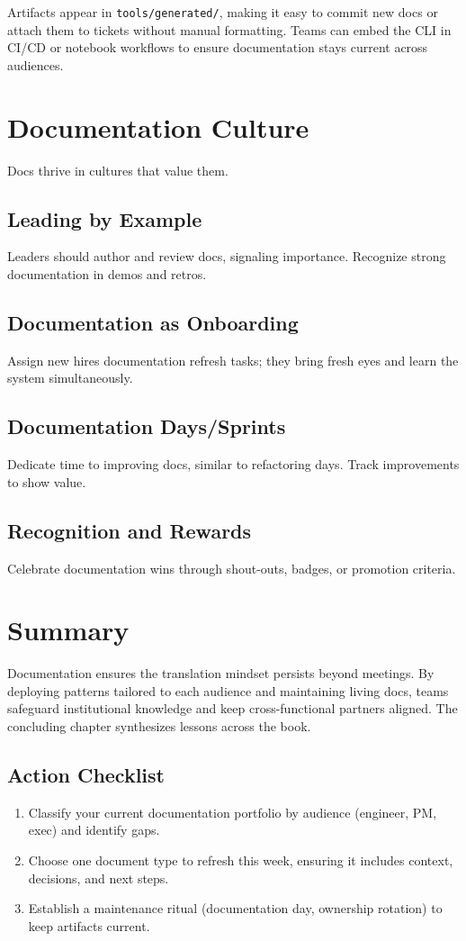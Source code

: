 Artifacts appear in \texttt{tools/generated/}, making it easy to commit new docs or attach them to tickets without manual formatting. Teams can embed the CLI in CI/CD or notebook workflows to ensure documentation stays current across audiences.

\section{Documentation Culture}
\label{sec:doc-culture}

Docs thrive in cultures that value them.

\subsection{Leading by Example}
Leaders should author and review docs, signaling importance. Recognize strong documentation in demos and retros.

\subsection{Documentation as Onboarding}
Assign new hires documentation refresh tasks; they bring fresh eyes and learn the system simultaneously.

\subsection{Documentation Days/Sprints}
Dedicate time to improving docs, similar to refactoring days. Track improvements to show value.

\subsection{Recognition and Rewards}
Celebrate documentation wins through shout-outs, badges, or promotion criteria.

\section{Summary}
\label{sec:docs-summary}

Documentation ensures the translation mindset persists beyond meetings. By deploying patterns tailored to each audience and maintaining living docs, teams safeguard institutional knowledge and keep cross-functional partners aligned. The concluding chapter synthesizes lessons across the book.

\subsection{Action Checklist}
\begin{enumerate}
    \item Classify your current documentation portfolio by audience (engineer, PM, exec) and identify gaps.
    \item Choose one document type to refresh this week, ensuring it includes context, decisions, and next steps.
    \item Establish a maintenance ritual (documentation day, ownership rotation) to keep artifacts current.
\end{enumerate}

